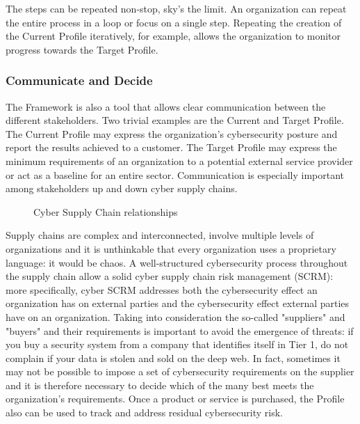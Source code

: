 The steps can be repeated non-stop, sky's the limit. An organization can repeat the entire process in a loop or focus on a single step. Repeating the creation of the Current Profile iteratively, for example, allows the organization to monitor progress towards the Target Profile.
\subsubsection{Communicate and Decide}
The Framework is also a tool that allows clear communication between the different stakeholders. Two trivial examples are the Current and Target Profile. The Current Profile may express the organization's cybersecurity posture and report the results achieved to a customer. The Target Profile may express the minimum requirements of an organization to a potential external service provider or act as a baseline for an entire sector. Communication is especially important among stakeholders up and down cyber supply chains.
\begin{figure}[H]
  \centering
  
  \caption{Cyber Supply Chain relationships}
\end{figure}
\noindent
Supply chains are complex and interconnected, involve multiple levels of organizations and it is unthinkable that every organization uses a proprietary language: it would be chaos. A well-structured cybersecurity process throughout the supply chain allow a solid cyber supply chain risk management (SCRM): more specifically, cyber SCRM addresses both the cybersecurity effect an organization has on external parties and the cybersecurity effect external parties have on an organization. Taking into consideration the so-called "suppliers" and "buyers" and their requirements is important to avoid the emergence of threats: if you buy a security system from a company that identifies itself in Tier 1, do not complain if your data is stolen and sold on the deep web. In fact, sometimes it may not be possible to impose a set of cybersecurity requirements on the supplier and it is therefore necessary to decide which of the many best meets the organization's requirements. Once a product or service is purchased, the Profile also can be used to track and address residual cybersecurity risk.
